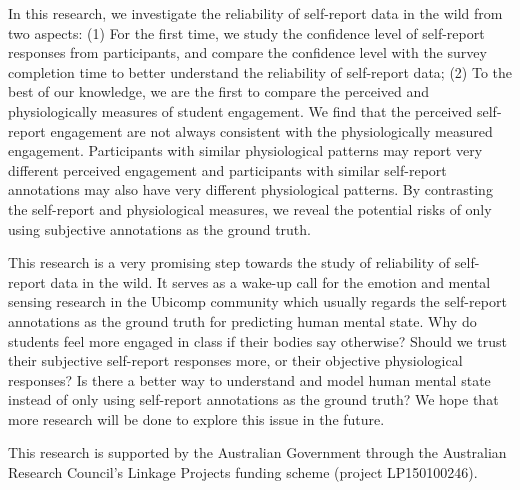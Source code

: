 \documentclass[sigconf]{acmart}
\begin{document}
In this research, we investigate the reliability of self-report data in the wild from two aspects: (1) For the first time, we study the confidence level of self-report responses from participants, and compare the confidence level with the survey
completion time to better understand the reliability of self-report data; (2) To the best of our knowledge, we are the first to compare the perceived and physiologically measures of student engagement. We find that the perceived self-report engagement are not always consistent with the physiologically measured engagement. Participants with similar physiological patterns may report very different perceived engagement and participants with similar self-report annotations may also have very different physiological patterns. By contrasting the self-report and physiological measures, we reveal the potential risks of only using subjective annotations as the ground truth. %






This research is a very promising step towards the study of reliability of self-report data in the wild. It serves as a wake-up call for the emotion and mental sensing research in the Ubicomp community which usually regards the self-report annotations as the ground truth for predicting human mental state. Why do students feel more engaged in class if their bodies say otherwise? Should we trust their subjective self-report responses more, or their objective physiological responses? Is there a better way to understand and model human mental state instead of only using self-report annotations as the ground truth? We hope that more research will be done to explore this issue in the future.





\begin{acks}
This research is supported by the Australian Government through the Australian Research Council's Linkage Projects funding scheme (project LP150100246).
\end{acks}





\end{document}
